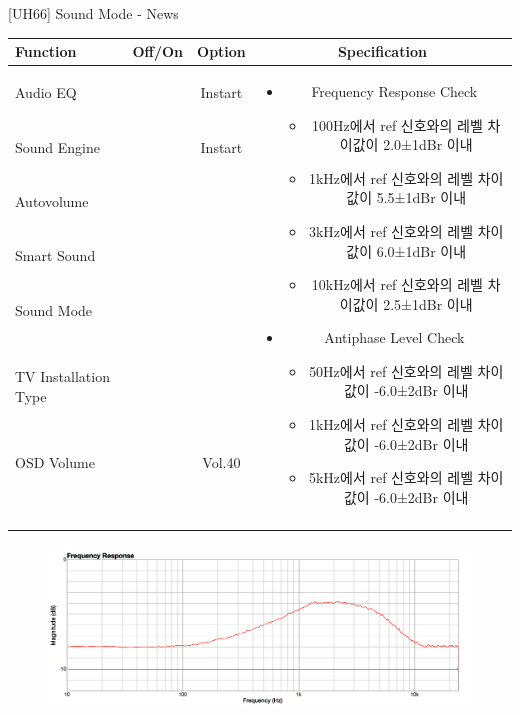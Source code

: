 \begin{frame}[t]{[UH66] Sound Mode - News}
\begin{tiny}
\begin{tabular}{@{}lccc@{}}
\toprule
Function & Off/On & Option & Specification \\
\midrule
Audio EQ & \color{black}{Off} & Instart &
\multirow{10}{60mm}{
\begin{itemize}
\item Frequency Response Check
	\begin{itemize}
	\item 100Hz에서 ref 신호와의 레벨 차이값이 2.0±1dBr 이내
	\item 1kHz에서 ref 신호와의 레벨 차이값이 5.5±1dBr 이내
	\item 3kHz에서 ref 신호와의 레벨 차이값이 6.0±1dBr 이내
	\item 10kHz에서 ref 신호와의 레벨 차이값이 2.5±1dBr 이내
	\end{itemize}
\item Antiphase Level Check
	\begin{itemize}
	\item 50Hz에서 ref 신호와의 레벨 차이값이 -6.0±2dBr 이내
	\item 1kHz에서 ref 신호와의 레벨 차이값이 -6.0±2dBr 이내
	\item 5kHz에서 ref 신호와의 레벨 차이값이 -6.0±2dBr 이내
	\end{itemize}
\end{itemize}
} \\
Sound Engine & \color{blue}{On} & Instart & \\
Autovolume & \color{black}{Off} & & \\
Smart Sound & \color{black}{Off} & & \\
Sound Mode & \color{blue}{On} & \color{blue}{Clearvoice} & \\
TV Installation Type & \color{blue}{On} & \color{black}{Standtype1} & \\
OSD Volume & \color{blue}{On} & Vol.40 & \\
& & & \\
& & & \\
& & & \\
& & & \\
\midrule
\end{tabular}
\end{tiny}

\begin{figure}[b]
\includegraphics[height=0.3\textwidth]{figures/clearvoice.png}
\end{figure}

\end{frame}
